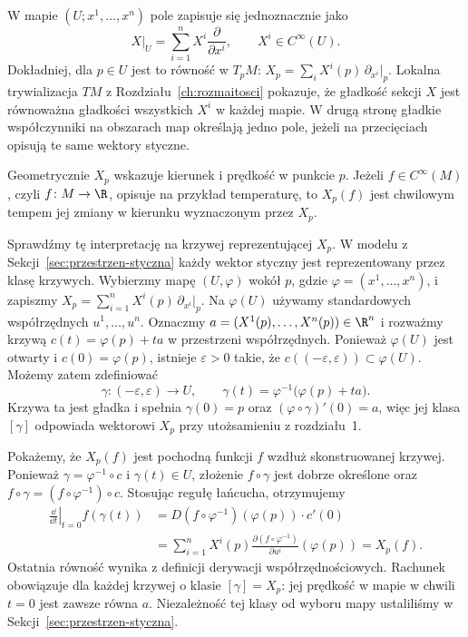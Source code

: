 W mapie $(U;x^1,\ldots,x^n)$ pole zapisuje się jednoznacznie jako
\begin{equation}\label{eq:lokalne-pole}
 X\big|_U=\sum_{i=1}^{n}X^i\frac{\partial}{\partial x^i},
 \qquad X^i\in C^\infty(U).
\end{equation}
Dokładniej, dla $p\in U$ jest to równość w $T_pM$:
$X_p=\sum_iX^i(p)\,\partial_{x^i}|_p$.
Lokalna trywializacja $TM$ z Rozdziału~\ref{ch:rozmaitosci}
pokazuje, że gładkość sekcji $X$ jest równoważna gładkości
wszystkich $X^i$ w każdej mapie. W drugą stronę gładkie współczynniki
na obszarach map określają jedno pole, jeżeli na przecięciach
opisują te same wektory styczne.

Geometrycznie $X_p$ wskazuje kierunek i prędkość w punkcie $p$.
Jeżeli $f\in C^\infty(M)$, czyli $f\colon M\to\R$,
opisuje na przykład temperaturę, to $X_p(f)$ jest chwilowym
tempem jej zmiany w kierunku wyznaczonym przez $X_p$.

Sprawdźmy tę interpretację na krzywej reprezentującej $X_p$.
W modelu z Sekcji~\ref{sec:przestrzen-styczna} każdy wektor
styczny jest reprezentowany przez klasę krzywych.
Wybierzmy mapę $(U,\varphi)$ wokół $p$, gdzie
$\varphi=(x^1,\ldots,x^n)$, i zapiszmy
$X_p=\sum_{i=1}^n X^i(p)\,\partial_{x^i}|_p$.
Na $\varphi(U)$ używamy standardowych współrzędnych
$u^1,\ldots,u^n$.
Oznaczmy $a=(X^1(p),\ldots,X^n(p))\in\R^n$ i rozważmy
krzywą $c(t)=\varphi(p)+ta$ w przestrzeni współrzędnych.
Ponieważ $\varphi(U)$ jest otwarty i $c(0)=\varphi(p)$,
istnieje $\varepsilon>0$ takie, że
$c((-\varepsilon,\varepsilon))\subset\varphi(U)$.
Możemy zatem zdefiniować
\[
\gamma\colon(-\varepsilon,\varepsilon)\to U,
\qquad
\gamma(t)=\varphi^{-1}\bigl(\varphi(p)+ta\bigr).
\]
Krzywa ta jest gładka i spełnia $\gamma(0)=p$ oraz
$(\varphi\circ\gamma)'(0)=a$, więc jej klasa $[\gamma]$
odpowiada wektorowi $X_p$ przy utożsamieniu
z rozdziału~1.

Pokażemy, że $X_p(f)$ jest pochodną funkcji $f$
wzdłuż skonstruowanej krzywej. Ponieważ
$\gamma=\varphi^{-1}\circ c$ i $\gamma(t)\in U$,
złożenie $f\circ\gamma$ jest dobrze określone oraz
$f\circ\gamma=(f\circ\varphi^{-1})\circ c$.
Stosując regułę łańcucha, otrzymujemy
\[
\begin{aligned}
\left.\frac{\dd}{\dd t}\right|_{t=0}f(\gamma(t))
&=D(f\circ\varphi^{-1})(\varphi(p))\cdot c'(0)\\
&=\sum_{i=1}^n X^i(p)
  \frac{\partial(f\circ\varphi^{-1})}{\partial u^i}
  (\varphi(p))
=X_p(f).
\end{aligned}
\]
Ostatnia równość wynika z definicji derywacji
współrzędnościowych. Rachunek obowiązuje dla każdej krzywej
o klasie $[\gamma]=X_p$: jej prędkość w mapie w chwili $t=0$
jest zawsze równa $a$. Niezależność tej klasy od wyboru mapy
ustaliliśmy w Sekcji~\ref{sec:przestrzen-styczna}.

